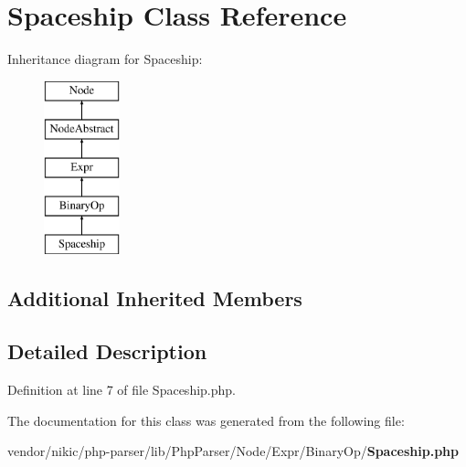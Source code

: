 \section{Spaceship Class Reference}
\label{class_php_parser_1_1_node_1_1_expr_1_1_binary_op_1_1_spaceship}
Inheritance diagram for Spaceship\+:\begin{figure}[H]
\begin{center}
\leavevmode
\includegraphics[height=5.000000cm]{class_php_parser_1_1_node_1_1_expr_1_1_binary_op_1_1_spaceship}
\end{center}
\end{figure}
\subsection*{Additional Inherited Members}


\subsection{Detailed Description}


Definition at line 7 of file Spaceship.\+php.



The documentation for this class was generated from the following file\+:\begin{DoxyCompactItemize}
\item 
vendor/nikic/php-\/parser/lib/\+Php\+Parser/\+Node/\+Expr/\+Binary\+Op/{\bf Spaceship.\+php}\end{DoxyCompactItemize}
